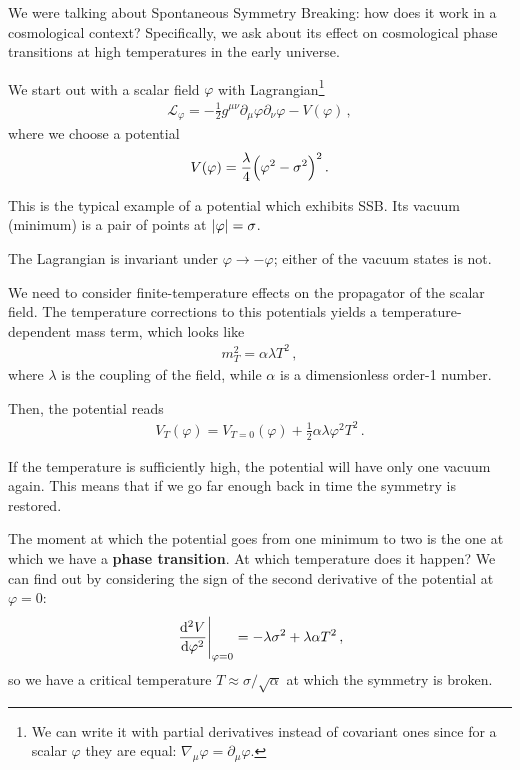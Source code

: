 \documentclass[main.tex]{subfiles}
\begin{document}

We were talking about Spontaneous Symmetry Breaking: how does it work in a cosmological context? 
Specifically, we ask about its effect on cosmological phase transitions at high temperatures in the early universe. 

We start out with a scalar field \(\varphi \) with Lagrangian\footnote{We can write it with partial derivatives instead of covariant ones since for a scalar \(\varphi \) they are equal: \(\nabla_{\mu } \varphi = \partial_{\mu} \varphi \).}
%
\begin{align}
\mathscr{L}_\varphi = 
- \frac{1}{2} g^{\mu \nu } \partial_{\mu } \varphi \partial_{\nu } \varphi 
- V(\varphi )
\,,
\end{align}
%
where we choose a potential 
%
\begin{align}
V(\varphi ) = \frac{\lambda }{4} \qty(\varphi^2 - \sigma^2)^2
\,.
\end{align}

This is the typical example of a potential which exhibits SSB. Its vacuum (minimum) is a pair of points at \(\abs{\varphi} = \sigma \).

The Lagrangian is invariant under \(\varphi \to - \varphi \); either of the vacuum states is not. 

We need to consider finite-temperature effects on the propagator of the scalar field. 
The temperature corrections to this potentials yields a temperature-dependent mass term, which looks like 
%
\begin{align}
m^2_T = \alpha \lambda T^2
\,,
\end{align}
%
where \(\lambda \) is the coupling of the field, while \(\alpha \) is a dimensionless order-1 number. 

Then, the potential reads 
%
\begin{align}
V_T (\varphi ) = V_{T=0}(\varphi ) + \frac{1}{2} \alpha \lambda \varphi^2 T^2
\,.
\end{align}

If the temperature is sufficiently high, the potential will have only one vacuum again. 
This means that if we go far enough back in time the symmetry is restored. 

The moment at which the potential goes from one minimum to two is the one at which we have a \textbf{phase transition}. At which temperature does it happen? We can find out by considering the sign of the second derivative of the potential at \(\varphi = 0\): 
%
\begin{align}
\eval{\dv[2]{V}{\varphi }}_{\varphi =0}  = - \lambda \sigma^2 + \lambda \alpha T^2
\,,
\end{align}
%
so we have a critical temperature \(T \approx \sigma / \sqrt{\alpha }\) at which the symmetry is broken.
\end{document}
